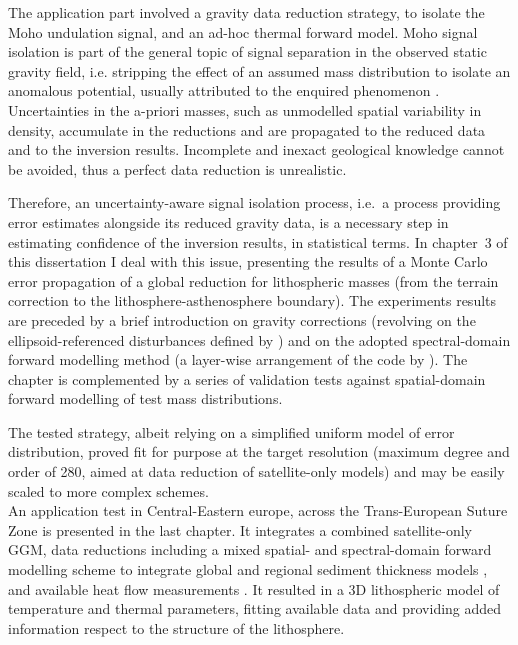 The application part involved a gravity data reduction strategy, to isolate the Moho undulation signal, and an ad-hoc thermal forward model.
Moho signal isolation is part of the general topic of signal separation in the observed static gravity field, i.e. stripping the effect of an assumed mass distribution to isolate an anomalous potential, usually attributed to the enquired phenomenon \parencites{Mikuska2007}{Sjoberg2013}{Aitken2015}[][, to name a few]{Tenzer2019}.
Uncertainties in the a-priori masses, such as unmodelled spatial variability in density, accumulate in the reductions and are propagated to the reduced data and to the inversion results.
Incomplete and inexact geological knowledge cannot be avoided, thus a perfect data reduction is unrealistic.

Therefore, an uncertainty-aware signal isolation process, i.e.~a process providing error estimates alongside its reduced gravity data, is a necessary step in estimating confidence of the inversion results, in statistical terms.
In chapter~3 of this dissertation I deal with this issue, presenting the results of a Monte Carlo error propagation \parencite{Aster2018} of a global reduction for lithospheric masses (from the terrain correction to the lithosphere-asthenosphere boundary).
The experiments results are preceded by a brief introduction on gravity corrections (revolving on the ellipsoid-referenced disturbances defined by \cite{Vajda2008}) and on the adopted spectral-domain forward modelling method (a layer-wise arrangement of the code by \cite{Wieczorek2018}).
The chapter is complemented by a series of validation tests against spatial-domain forward modelling of test mass distributions.

The tested strategy, albeit relying on a simplified uniform model of error distribution, proved fit for purpose at the target resolution (maximum degree and order of 280, aimed at data reduction of satellite-only models) and may be easily scaled to more complex schemes.
\\

An application test in Central-Eastern europe, across the Trans-European Suture Zone is presented in the last chapter.
It integrates a combined satellite-only GGM, data reductions including a mixed spatial- and spectral-domain forward modelling scheme to integrate global and regional sediment thickness models \parencite{EuCRUST07}, and available heat flow measurements \parencite{globalHF}.
It resulted in a 3D lithospheric model of temperature and thermal parameters, fitting available data and providing added information respect to the structure of the lithosphere.

